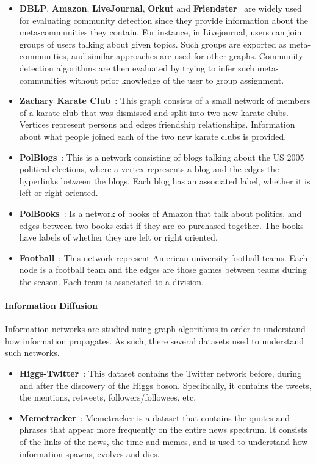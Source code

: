 \begin{itemize}
  \item \textbf{DBLP}, \textbf{Amazon}, \textbf{LiveJournal}, \textbf{Orkut} and \textbf{Friendster}~\cite{yang2015defining}
    are widely used for evaluating community detection since they provide
    information about the meta-communities they contain. For instance, in
    Livejournal, users can join groups of users talking about given topics. Such
    groups are exported as meta-communities, and similar approaches are used for
    other graphs. Community detection algorithms are then evaluated by trying to
    infer such meta-communities without prior knowledge of the user to group
    assignment.
  \item \textbf{Zachary Karate Club}~\cite{zachary1977information}: This graph consists
    of a small network of members of a karate club that was dismissed and split
    into two new karate clubs. Vertices represent persons and edges friendship
    relationships. Information about what people joined each of the two new
    karate clubs is provided.
  \item \textbf{PolBlogs}~\cite{adamic2005political}: This is a network consisting of
    blogs talking about the US 2005 political elections, where a vertex
    represents a blog and the edges the hyperlinks between the blogs. Each blog
    has an associated label, whether it is left or right oriented.
  \item \textbf{PolBooks}~\cite{10dimacs}: Is a network of books of Amazon that talk
    about politics, and edges between two books exist if they are co-purchased
    together. The books have labels of whether they are left or right oriented.
  \item \textbf{Football}~\cite{girvan2002network}: This network represent American university
    football teams. Each node is a football team and the edges are those 
    games between teams during the season. Each team is associated to a
    division.
\end{itemize}

\paragraph{Information Diffusion}

Information networks are studied using graph algorithms in order to understand
how information propagates. As such, there several datasets used to understand
such networks.

\begin{itemize}
  \item \textbf{Higgs-Twitter}~\cite{de2013anatomy}: This dataset contains the Twitter
    network before, during and after the discovery of the Higgs boson.
    Specifically, it contains the tweets, the mentions, retweets,
    followers/followees, etc.
  \item \textbf{Memetracker}~\cite{leskovec2009meme}: Memetracker is a dataset that
    contains the quotes and phrases that appear more frequently on the entire
    news spectrum. It consists of the links of the news, the time and memes, and
    is used to understand how information spawns, evolves and dies.
\end{itemize}

